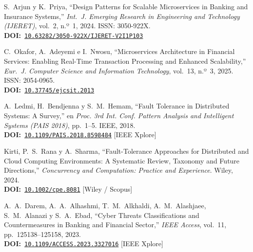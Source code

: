 \documentclass[12pt,a4paper]{article}
\begin{document}
\begin{enumerate}[leftmargin=0.6cm, label={[\arabic*]}, itemsep=6pt]
  \item S.~Arjun y K.~Priya,
        ``Design Patterns for Scalable Microservices in Banking and Insurance
        Systems,''
        \textit{Int.\ J. Emerging Research in Engineering and Technology
        (IJERET)}, vol.~2, n.º~1, 2024. ISSN: 3050-922X.\\
        \textbf{DOI:}~\href{https://doi.org/10.63282/3050-922X/IJERET-V2I1P103}%
        {\texttt{10.63282/3050-922X/IJERET-V2I1P103}}

  \item C.~Okafor, A.~Adeyemi e I.~Nwosu,
        ``Microservices Architecture in Financial Services: Enabling Real-Time
        Transaction Processing and Enhanced Scalability,''
        \textit{Eur.\ J. Computer Science and Information Technology},
        vol.~13, n.º~3, 2025. ISSN: 2054-0965.\\
        \textbf{DOI:}~\href{https://doi.org/10.37745/ejcsit.2013}%
        {\texttt{10.37745/ejcsit.2013}}

  \item A.~Ledmi, H.~Bendjenna y S.~M.~Hemam,
        ``Fault Tolerance in Distributed Systems: A Survey,''
        en \textit{Proc. 3rd Int. Conf. Pattern Analysis and Intelligent
        Systems (PAIS 2018)}, pp.~1--5. IEEE, 2018.\\
        \textbf{DOI:}~\href{https://doi.org/10.1109/PAIS.2018.8598484}%
        {\texttt{10.1109/PAIS.2018.8598484}} \textnormal{[IEEE Xplore]}

  \item Kirti, P.~S.~Rana y A.~Sharma,
        ``Fault-Tolerance Approaches for Distributed and Cloud Computing
        Environments: A Systematic Review, Taxonomy and Future Directions,''
        \textit{Concurrency and Computation: Practice and Experience}.
        Wiley, 2024.\\
        \textbf{DOI:}~\href{https://doi.org/10.1002/cpe.8081}%
        {\texttt{10.1002/cpe.8081}} \textnormal{[Wiley / Scopus]}

  \item A.~A.~Darem, A.~A.~Alhashmi, T.~M.~Alkhaldi, A.~M.~Alashjaee,
        S.~M.~Alanazi y S.~A.~Ebad,
        ``Cyber Threats Classifications and Countermeasures in Banking and
        Financial Sector,''
        \textit{IEEE Access}, vol.~11, pp.~125138--125158, 2023.\\
        \textbf{DOI:}~\href{https://doi.org/10.1109/ACCESS.2023.3327016}%
        {\texttt{10.1109/ACCESS.2023.3327016}} \textnormal{[IEEE Xplore]}

\end{enumerate}
\end{document}
